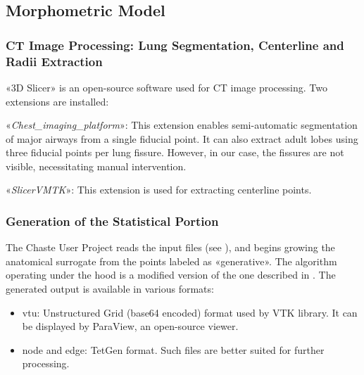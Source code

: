 \subsection{Morphometric Model}
\label{subsec:morphometric_model}

\subsubsection{CT Image Processing: Lung Segmentation, Centerline and
  Radii Extraction}
\label{subsubsec:ct_centerline_radii_extraction}

«3D Slicer» is an open-source software used for CT image processing.
Two extensions are installed:

\begin{description}
\item «\emph{Chest\_imaging\_platform}»: This extension enables
  semi-automatic segmentation of major airways from a single fiducial
  point.  It can also extract adult lobes using three fiducial points
  per lung fissure. However, in our case, the fissures are not
  visible, necessitating manual intervention.
\item «\emph{SlicerVMTK}»: This extension is used for extracting
  centerline points.
\end{description}

\subsubsection{Generation of the Statistical Portion}
\label{subsubsec:statistical_generation}


The Chaste User Project reads the input files (see
), and begins growing the anatomical surrogate
from the points labeled as «generative».  The algorithm operating
under the hood is a modified version of the one described in
\cite{tawhai2000}.  The generated output is available in various
formats:

\begin{itemize}
\item vtu: Unstructured Grid (base64 encoded) format used by VTK
  library.  It can be displayed by ParaView, an open-source viewer.
\item node and edge: TetGen format.  Such files are better suited for
  further processing.
\end{itemize}

